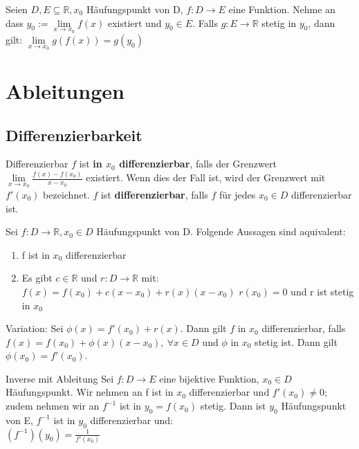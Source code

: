 \documentclass[a4paper,10pt]{article}
\def\R{\mathbb{R}}
\begin{document}
Seien $D,E\subseteq \R, x_0$ Häufungspunkt von D, $f:D\to E$ eine Funktion. Nehme an dass $y_0 := \lim\limits_{x\to x_0}f(x)$ existiert und $y_0 \in E$. Falls $g:E\to\R$ stetig in $y_0$, dann gilt: $\lim\limits_{x\to x_0}g(f(x)) = g(y_0)$

\section{Ableitungen}
\subsection{Differenzierbarkeit}
\begin{mainbox}{Differenzierbar}
 $f$ ist \textbf{in $x_0$ differenzierbar}, falls der Grenzwert $\lim\limits_{x\to x_0} \frac{f(x) - f(x_0)}{x - x_0}$ existiert. Wenn dies der Fall ist, wird der Grenzwert mit $f'(x_0)$ bezeichnet. $f$ ist \textbf{differenzierbar}, falls $f$ für jedes $x_0 \in D$ differenzierbar ist.
\end{mainbox}

Sei $f: D \to \R, x_0 \in D$ Häufungspunkt von D. Folgende Aussagen sind aquivalent:
\begin{enumerate}
  \item f ist in $x_0$ differenzierbar
  \item Es gibt $c \in \R$ und $r: D\to \R$ mit:
    \subitem $f(x) = f(x_0) + c(x-x_0) +r(x)(x-x_0)$
    \subitem $r(x_0) = 0$ und r ist stetig in $x_0$
\end{enumerate}

Variation: Sei $\phi(x) = f'(x_0) + r(x)$. Dann gilt $f$ in $x_0$ differenzierbar, falls $f(x) = f(x_0) + \phi(x) (x-x_0), \ \forall x \in D$ und $\phi$ in $x_0$ stetig ist.
Dann gilt $\phi(x_0) = f'(x_0)$.

\begin{subbox}{Inverse mit Ableitung}
  Sei $f: D\to E$ eine bijektive Funktion, $x_0 \in D$ Häufungspunkt. Wir nehmen an f ist in $x_0$ differenzierbar und $f'(x_0) \neq 0$; zudem nehmen wir an $f^{-1}$ ist in $y_0 = f(x_0)$ stetig. Dann ist $y_0$ Häufungspunkt von E, $f^{-1}$ ist in $y_0$ differenzierbar und:\\ $(f^{-1})(y_0) = \frac{1}{f'(x_0)}$
\end{subbox}
\end{document}
